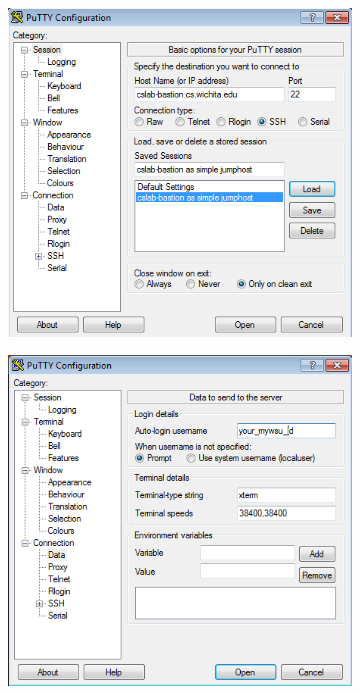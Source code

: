 \documentclass[12pt]{article}
\begin{document}
\begin{enumerate}
\begin{figure}[bh!]
\centering
\begin{subfigure}{.5\textwidth}
  \centering
  \includegraphics[width=.9\linewidth]{putty_cslab_bastion_session}
  \label{fig:sub1}
\end{subfigure}
\begin{subfigure}{.5\textwidth}
  \centering
  \includegraphics[width=.9\linewidth]{putty_cslab_auto_login_username}

\end{subfigure}
\end{figure}
\end{enumerate}
\end{document}
